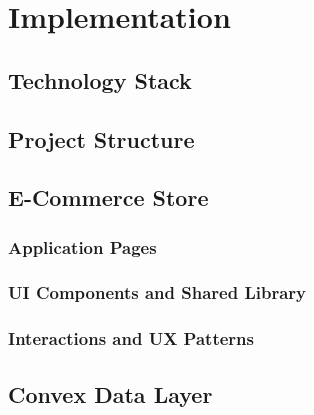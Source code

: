 \chapter{Implementation}
\label{chap:implementation}

\section{Technology Stack}
\label{sec:impl-stack}


\section{Project Structure}
\label{sec:impl-structure}


\section{E-Commerce Store}
\label{sec:impl-store}

\subsection{Application Pages}
\label{subsec:impl-pages}


\subsection{UI Components and Shared Library}
\label{subsec:impl-components}


\subsection{Interactions and UX Patterns}
\label{subsec:impl-ux}


\section{Convex Data Layer}
\label{sec:impl-data}


